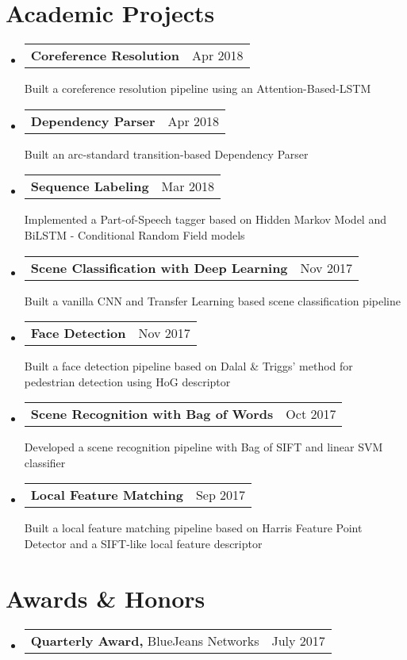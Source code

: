 \documentclass[letterpaper,11pt]{article}
\makeatletter
\newcommand{\teachingExperienceRow}[2]{
  \vspace{-1pt}\item[]
    \begin{tabular*}{0.97\textwidth}{l@{\extracolsep{\fill}}r}
    \small{#1} & \small{#2}
    \end{tabular*}\vspace{-7pt}
}
\newcommand{\resumeSubItem}[3]{
  \vspace{-1pt}\item[]
    \begin{tabular*}{0.97\textwidth}{l@{\extracolsep{\fill}}r}
      \textbf{\small#1} & {\small#2}
    \end{tabular*}
    {\small#3}\vspace{-5pt}
}
\newcommand{\resumeSubHeadingListStart}{\begin{itemize}[label={}, leftmargin=*]}
\newcommand{\resumeSubHeadingListEnd}{\end{itemize}}
\makeatother
\begin{document}
\section{Academic Projects}
  \resumeSubHeadingListStart  	
	\resumeSubItem{Coreference Resolution}{Apr 2018}{Built a coreference resolution pipeline using an Attention-Based-LSTM}
    \resumeSubItem{Dependency Parser}{Apr 2018}{Built an arc-standard transition-based Dependency Parser}
	\resumeSubItem{Sequence Labeling}{Mar 2018}{Implemented a Part-of-Speech tagger based on Hidden Markov Model and BiLSTM - Conditional Random Field models}
    \resumeSubItem{Scene Classification with Deep Learning}{Nov 2017}{Built a vanilla CNN and Transfer Learning based scene classification pipeline}
    \resumeSubItem{Face Detection}{Nov 2017} {Built a face detection pipeline based on Dalal \& Triggs’ method for pedestrian detection using HoG descriptor}
    \resumeSubItem{Scene Recognition with Bag of Words}{Oct 2017} {Developed a scene recognition pipeline with Bag of SIFT and linear SVM classifier}
    \resumeSubItem{Local Feature Matching}{Sep 2017} {Built a local feature matching pipeline based on Harris Feature Point Detector and a SIFT-like local feature descriptor}
  \resumeSubHeadingListEnd

\vspace{-7pt}
\section{Awards \& Honors}
  \vspace{-2pt} \resumeSubHeadingListStart
   \teachingExperienceRow {\textbf{Quarterly Award,} BlueJeans Networks}{July 2017}
   \resumeSubHeadingListEnd

\end{document}

